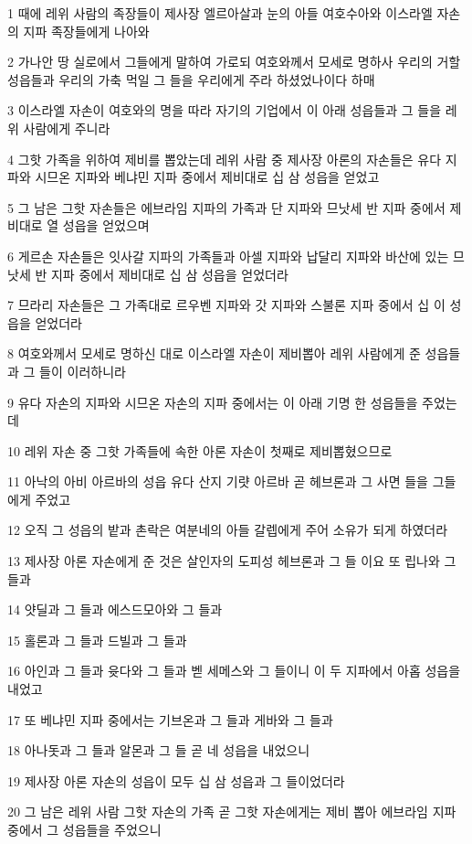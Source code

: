 \par 1 때에 레위 사람의 족장들이 제사장 엘르아살과 눈의 아들 여호수아와 이스라엘 자손의 지파 족장들에게 나아와
\par 2 가나안 땅 실로에서 그들에게 말하여 가로되 여호와께서 모세로 명하사 우리의 거할 성읍들과 우리의 가축 먹일 그 들을 우리에게 주라 하셨었나이다 하매
\par 3 이스라엘 자손이 여호와의 명을 따라 자기의 기업에서 이 아래 성읍들과 그 들을 레위 사람에게 주니라
\par 4 그핫 가족을 위하여 제비를 뽑았는데 레위 사람 중 제사장 아론의 자손들은 유다 지파와 시므온 지파와 베냐민 지파 중에서 제비대로 십 삼 성읍을 얻었고
\par 5 그 남은 그핫 자손들은 에브라임 지파의 가족과 단 지파와 므낫세 반 지파 중에서 제비대로 열 성읍을 얻었으며
\par 6 게르손 자손들은 잇사갈 지파의 가족들과 아셀 지파와 납달리 지파와 바산에 있는 므낫세 반 지파 중에서 제비대로 십 삼 성읍을 얻었더라
\par 7 므라리 자손들은 그 가족대로 르우벤 지파와 갓 지파와 스불론 지파 중에서 십 이 성읍을 얻었더라
\par 8 여호와께서 모세로 명하신 대로 이스라엘 자손이 제비뽑아 레위 사람에게 준 성읍들과 그 들이 이러하니라
\par 9 유다 자손의 지파와 시므온 자손의 지파 중에서는 이 아래 기명 한 성읍들을 주었는데
\par 10 레위 자손 중 그핫 가족들에 속한 아론 자손이 첫째로 제비뽑혔으므로
\par 11 아낙의 아비 아르바의 성읍 유다 산지 기럇 아르바 곧 헤브론과 그 사면 들을 그들에게 주었고
\par 12 오직 그 성읍의 밭과 촌락은 여분네의 아들 갈렙에게 주어 소유가 되게 하였더라
\par 13 제사장 아론 자손에게 준 것은 살인자의 도피성 헤브론과 그 들 이요 또 립나와 그 들과
\par 14 얏딜과 그 들과 에스드모아와 그 들과
\par 15 홀론과 그 들과 드빌과 그 들과
\par 16 아인과 그 들과 윳다와 그 들과 벧 세메스와 그 들이니 이 두 지파에서 아홉 성읍을 내었고
\par 17 또 베냐민 지파 중에서는 기브온과 그 들과 게바와 그 들과
\par 18 아나돗과 그 들과 알몬과 그 들 곧 네 성읍을 내었으니
\par 19 제사장 아론 자손의 성읍이 모두 십 삼 성읍과 그 들이었더라
\par 20 그 남은 레위 사람 그핫 자손의 가족 곧 그핫 자손에게는 제비 뽑아 에브라임 지파 중에서 그 성읍들을 주었으니
